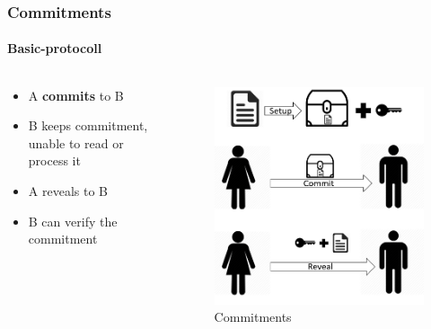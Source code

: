 \begin{frame}
	\frametitle{Commitments}
	\framesubtitle{Basic-protocoll}
	\begin{columns}
		\begin{column}{0.5\textwidth}
			\begin{LARGE}
				\begin{itemize}
					\item A \textbf{commits} to B
					\item B keeps commitment, unable to read or process it
					\item A reveals to B
					\item B can verify the commitment 
				\end{itemize}
			\end{LARGE}
		\end{column}
		\begin{column}{0.5\textwidth}
			\begin{figure}
				\centering
				\includegraphics[width=0.8\linewidth]{Images/protocoll}
				\caption[Commitments]{Commitments}
				\label{fig:protocoll}
			\end{figure}
		\end{column}
	\end{columns}	
\end{frame}

